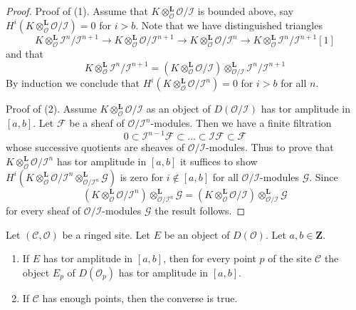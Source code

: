 \begin{proof}
Proof of (1). Assume that
$K \otimes_\mathcal{O}^\mathbf{L} \mathcal{O}/\mathcal{I}$
is bounded above, say
$H^i(K \otimes_\mathcal{O}^\mathbf{L} \mathcal{O}/\mathcal{I}) = 0$
for $i > b$. Note that we have distinguished triangles
$$
K \otimes_\mathcal{O}^\mathbf{L}
\mathcal{I}^n/\mathcal{I}^{n + 1} \to
K \otimes_\mathcal{O}^\mathbf{L}
\mathcal{O}/\mathcal{I}^{n + 1} \to
K \otimes_\mathcal{O}^\mathbf{L}
\mathcal{O}/\mathcal{I}^n \to
K \otimes_\mathcal{O}^\mathbf{L}
\mathcal{I}^n/\mathcal{I}^{n + 1}[1]
$$
and that
$$
K \otimes_\mathcal{O}^\mathbf{L}
\mathcal{I}^n/\mathcal{I}^{n + 1} =
\left(
K \otimes_\mathcal{O}^\mathbf{L}
\mathcal{O}/\mathcal{I}\right)
\otimes_{\mathcal{O}/\mathcal{I}}^\mathbf{L}
\mathcal{I}^n/\mathcal{I}^{n + 1}
$$
By induction we conclude that
$H^i(K \otimes_\mathcal{O}^\mathbf{L} \mathcal{O}/\mathcal{I}^n) = 0$
for $i > b$ for all $n$.

\medskip\noindent
Proof of (2). Assume $K \otimes_\mathcal{O}^\mathbf{L} \mathcal{O}/\mathcal{I}$
as an object of $D(\mathcal{O}/\mathcal{I})$ has tor amplitude in $[a, b]$.
Let $\mathcal{F}$ be a sheaf of $\mathcal{O}/\mathcal{I}^n$-modules.
Then we have a finite filtration
$$
0 \subset \mathcal{I}^{n - 1}\mathcal{F} \subset \ldots
\subset \mathcal{I}\mathcal{F} \subset \mathcal{F}
$$
whose successive quotients are sheaves of $\mathcal{O}/\mathcal{I}$-modules.
Thus to prove that $K \otimes_\mathcal{O}^\mathbf{L} \mathcal{O}/\mathcal{I}^n$
has tor amplitude in $[a, b]$ it suffices to show
$H^i(K \otimes_\mathcal{O}^\mathbf{L} \mathcal{O}/\mathcal{I}^n
\otimes_{\mathcal{O}/\mathcal{I}^n}^\mathbf{L} \mathcal{G})$
is zero for $i \not \in [a, b]$ for all $\mathcal{O}/\mathcal{I}$-modules
$\mathcal{G}$. Since
$$
\left(K \otimes_\mathcal{O}^\mathbf{L} \mathcal{O}/\mathcal{I}^n\right)
\otimes_{\mathcal{O}/\mathcal{I}^n}^\mathbf{L} \mathcal{G}
=
\left(K \otimes_\mathcal{O}^\mathbf{L} \mathcal{O}/\mathcal{I}\right)
\otimes_{\mathcal{O}/\mathcal{I}}^\mathbf{L} \mathcal{G}
$$
for every sheaf of $\mathcal{O}/\mathcal{I}$-modules $\mathcal{G}$
the result follows.
\end{proof}

\begin{lemma}
\label{lemma-tor-amplitude-stalk}
Let $(\mathcal{C}, \mathcal{O})$ be a ringed site.
Let $E$ be an object of $D(\mathcal{O})$.
Let $a, b \in \mathbf{Z}$.
\begin{enumerate}
\item If $E$ has tor amplitude in $[a, b]$, then for every point $p$
of the site $\mathcal{C}$ the object $E_p$ of $D(\mathcal{O}_p)$
has tor amplitude in $[a, b]$.
\item If $\mathcal{C}$ has enough points, then the converse is true.
\end{enumerate}
\end{lemma}

